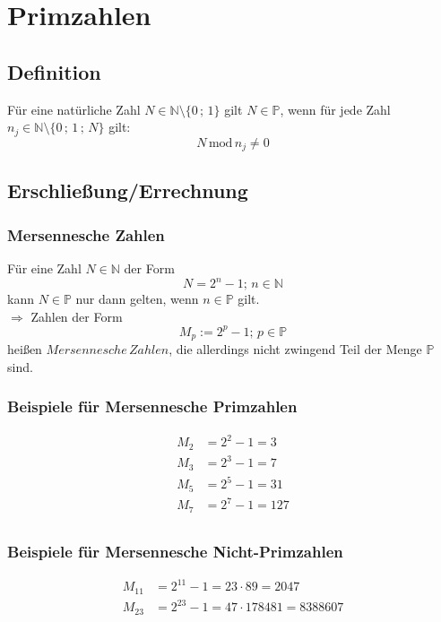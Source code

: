 \documentclass{article}
\newcommand{\PR}{\mathbb{P}}
\newcommand{\N}{\mathbb{N}}
\renewcommand{\mod}{\,\mathrm{mod}\,}
\begin{document}
\section{Primzahlen}
\subsection{Definition}

Für eine natürliche Zahl $N \in \N \setminus \{0\,;\,1\}$ gilt $N \in \PR$, wenn für jede Zahl $n_j \in \N \setminus \{0\,;\,1\,;\,N\}$ gilt:
\[ N \mod n_j \neq 0\]

\subsection{Erschließung/Errechnung}

\subsubsection{Mersennesche Zahlen}

Für eine Zahl $N \in \N$ der Form
\[ N = 2^n - 1;\, n \in \N\]
kann $N \in \PR$ nur dann gelten, wenn $n \in \PR$ gilt. \\

$\Longrightarrow$ Zahlen der Form
\[ M_p := 2^p - 1; \, p \in \PR \]
heißen $Mersennesche\,Zahlen$, die allerdings nicht zwingend Teil der Menge $\PR$ sind.

\subsubsection{Beispiele für Mersennesche Primzahlen}

\begin{align*}
M_2 &= 2^2 - 1 = 3		\\
M_3 &= 2^3 - 1 = 7		\\
M_5 &= 2^5 - 1 = 31		\\
M_7 &= 2^7 - 1 = 127	\\
\end{align*}

\subsubsection{Beispiele für Mersennesche Nicht-Primzahlen}
\begin{align*}
M_{11} &= 2^{11} - 1 = 23 \cdot 89 = 2047			\\
M_{23} &= 2^{23} - 1 = 47 \cdot 178481 = 8388607
\end{align*}
\end{document}
